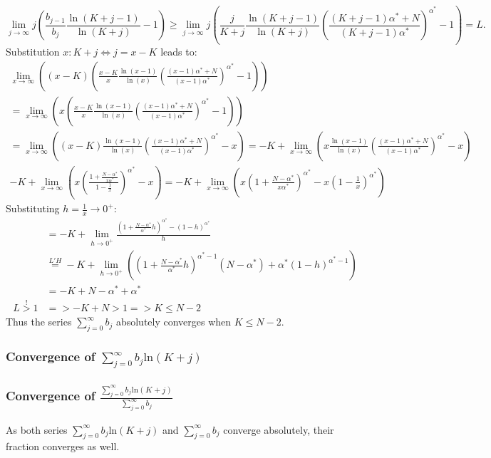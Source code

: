 \begin{equation}
\lim_{j \to \infty} j \left( \frac{b_{j-1}}{b_{j}} \frac{\ln(K+j-1)}{\ln(K+j)}   - 1   \right) \geq \lim_{j \to \infty} j \left( \frac{j}{K+j} \frac{\ln(K+j-1)}{\ln(K+j)} {\left( \frac{(K+j-1)\alpha^* + N}{(K+j-1)\alpha^* } \right)}^{\alpha^{*}} - 1   \right) = L.
\end{equation}
Substitution $x:K+j \Leftrightarrow j=x-K$ leads to:
\begin{equation}
\begin{split}
 \lim_{x \to \infty} \left( (x-K)  \left( \frac{x-K}{x} \frac{\ln(x-1)}{\ln(x)} {\left( \frac{(x-1)\alpha^* + N}{(x-1)\alpha^*} \right)}^{\alpha^{*}} - 1   \right) \right) \\ = \lim_{x \to \infty} \left( x  \left( \frac{x-K}{x} \frac{\ln(x-1)}{\ln(x)} {\left( \frac{(x-1)\alpha^* + N}{(x-1)\alpha^*} \right)}^{\alpha^{*}} - 1   \right) \right) \\
= \lim_{x \to \infty}  \left( (x-K) \frac{\ln(x-1)}{\ln(x)} {\left( \frac{(x-1)\alpha^* + N}{(x-1)\alpha^*} \right)}^{\alpha^{*}} - x   \right) = -K + \lim_{x \to \infty}  \left( x \frac{\ln(x-1)}{\ln(x)} {\left( \frac{(x-1)\alpha^* + N}{(x-1)\alpha^*} \right)}^{\alpha^{*}} - x   \right) \\ 
-K + \lim_{x \to \infty}  \left(x {\left( \frac{1+\frac{N-\alpha^{*}}{x\alpha^{*}}}{1-\frac{1}{x}} \right)}^{\alpha^{*}} - x   \right) = -K + \lim_{x \to \infty} \left( x{\left( 1 + \frac{N-\alpha^{*}}{x\alpha^{*}} \right)}^{\alpha^{*}} -x{\left( 1 - \frac{1}{x} \right)}^{\alpha^{*}} \right)
\end{split}
\end{equation}
Substituting $h = \frac{1}{x} \to 0^{+}$:
\begin{equation}
\begin{split}
&= -K + \lim_{h \to 0^{+}} \frac{ \left( 1+\frac{N-\alpha^{*}}{\alpha^{*}}h \right)^{\alpha^{*}} - {(1-h)}^{\alpha^{*}}}{h}  \\ &\stackrel{L'H}{=} -K + \lim_{h \to 0^{+}} \left( {\left( 1+\frac{N-\alpha^{*}}{\alpha^{*}}h \right)}^{\alpha^{*}-1}(N-\alpha^{*}) + \alpha^{*}(1-h)^{\alpha^{*}-1} \right) \\
 &= -K + N - \alpha^{*} + \alpha^{*} \\ 
 L \stackrel{!}{>} 1 & => -K + N > 1 => K \leq N-2
\end{split}
\end{equation}
Thus the series $\sum_{j=0}^{\infty}{b_j}$ absolutely converges when  $K \leq N-2$.

\subsubsection {Convergence of $\sum_{j=0}^{\infty}{b_j \mathrm{ln}(K+j)} $ }
\label{subsubsec:conv3}

\subsubsection {Convergence of $\frac{\sum_{j=0}^{\infty}{b_j \mathrm{ln}(K+j)}}{\sum_{j=0}^{\infty}{b_j}}$ }
\label{subsubsec:conv4}
As both series $\sum_{j=0}^{\infty}{b_j \mathrm{ln}(K+j)}$ and $\sum_{j=0}^{\infty}{b_j}$ converge absolutely, their fraction converges as well.
